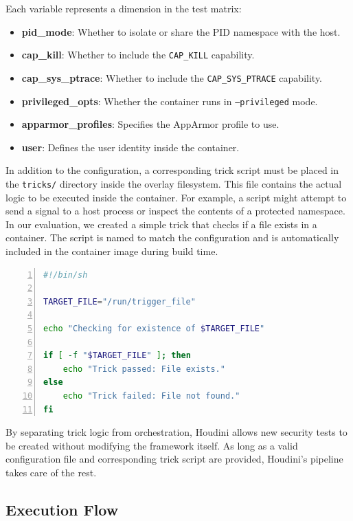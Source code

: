 \documentclass[12pt]{report}
\begin{document}
\begin{doublespace}
Each variable represents a dimension in the test matrix:
\begin{itemize}
\item \textbf{pid\_mode}: Whether to isolate or share the PID namespace with the host.
\item \textbf{cap\_kill}: Whether to include the \texttt{CAP\_KILL} capability.
\item \textbf{cap\_sys\_ptrace}: Whether to include the \texttt{CAP\_SYS\_PTRACE} capability.
\item \textbf{privileged\_opts}: Whether the container runs in \texttt{--privileged} mode.
\item \textbf{apparmor\_profiles}: Specifies the AppArmor profile to use.
\item \textbf{user}: Defines the user identity inside the container.
\end{itemize}


In addition to the configuration, a corresponding trick script must be placed in the \texttt{tricks/} directory inside the overlay filesystem. This file contains the actual logic to be executed inside the container. For example, a script might attempt to send a signal to a host process or inspect the contents of a protected namespace. In our evaluation, we created a simple trick that checks if a file exists in a container. The script is named to match the configuration and is automatically included in the container image during build time.

\begin{lstlisting}[language=bash, caption={Trick Configuration Parameters}, label={lst:escape-trick}, numbers=left, numberstyle=\tiny, stepnumber=1, frame=single, breaklines=true, backgroundcolor=\color{gray!10}, basicstyle=\ttfamily\footnotesize, showspaces=false, showstringspaces=false]
#!/bin/sh

TARGET_FILE="/run/trigger_file"

echo "Checking for existence of $TARGET_FILE"

if [ -f "$TARGET_FILE" ]; then
    echo "Trick passed: File exists."
else
    echo "Trick failed: File not found."
fi
\end{lstlisting}

By separating trick logic from orchestration, Houdini allows new security tests to be created without modifying the framework itself. As long as a valid configuration file and corresponding trick script are provided, Houdini’s pipeline takes care of the rest.

\subsection*{Execution Flow}


\end{doublespace}
\end{document}
